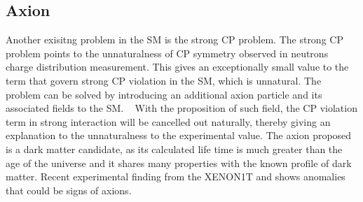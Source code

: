 
\subsection{Axion}
Another exisitng problem in the SM is the strong CP problem. The strong CP problem points to the unnaturalness of CP symmetry observed in neutrons charge distribution measurement. This gives an exceptionally small value to the term that govern strong CP violation in the SM, which is unnatural. The problem can be solved by introducing an additional axion particle and its associated fields to the SM. ~\cite{peccei1977cp} With the proposition of such field, the CP violation term in strong interaction will be cancelled out naturally, thereby giving an explanation to the unnaturalness to the experimental value. 
The axion proposed is a dark matter candidate, as its calculated life time is much greater than the age of the universe and it shares many properties with the known profile of dark matter. Recent experimental finding from the XENON1T and shows anomalies that could be signs of axions. ~\cite{aprile2020excess}




